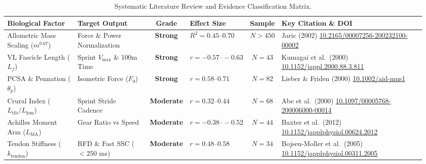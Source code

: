 \documentclass[11pt,a4paper]{article}
\begin{document}
\begin{table}[htbp]
\centering
\small
\caption{Systematic Literature Review and Evidence Classification Matrix.}
\label{tab:lit_matrix}
\begin{tabularx}{\textwidth}{p{3.2cm}p{2.8cm}cp{2.2cm}cp{3.4cm}}
\toprule
\textbf{Biological Factor} & \textbf{Target Output} & \textbf{Grade} & \textbf{Effect Size} & \textbf{Sample} & \textbf{Key Citation \& DOI} \\
\midrule
Allometric Mass Scaling ($m^{0.67}$) & Force \& Power Normalization & \textbf{Strong} & $R^2 = 0.45\text{--}0.70$ & $N > 450$ & Jaric (2002) \cite{jaric2002} \newline \href{https://doi.org/10.2165/00007256-200232100-00002}{10.2165/00007256-200232100-00002} \\
\addlinespace
VL Fascicle Length ($L_f$) & Sprint $V_{\text{max}}$ \& 100m Time & \textbf{Strong} & $r = -0.57\text{--}-0.63$ & $N = 43$ & Kumagai et al.\ (2000) \cite{kumagai2000} \newline \href{https://doi.org/10.1152/jappl.2000.88.3.811}{10.1152/jappl.2000.88.3.811} \\
\addlinespace
PCSA \& Pennation ($\theta_p$) & Isometric Force ($F_0$) & \textbf{Strong} & $r = 0.58\text{--}0.71$ & $N = 82$ & Lieber \& Friden (2000) \cite{lieber2000} \newline \href{https://doi.org/10.1002/1097-4598(200011)23:11<1647::aid-mus1>3.0.co;2-m}{10.1002/aid-mus1} \\
\addlinespace
Crural Index ($L_{\text{tib}}/L_{\text{fem}}$) & Sprint Stride Cadence & \textbf{Moderate} & $r = 0.32\text{--}0.44$ & $N = 68$ & Abe et al.\ (2000) \cite{abe2000} \newline \href{https://doi.org/10.1097/00005768-200006000-00014}{10.1097/00005768-200006000-00014} \\
\addlinespace
Achilles Moment Arm ($L_{\text{MA}}$) & Gear Ratio vs Speed & \textbf{Moderate} & $r = -0.38\text{--}-0.52$ & $N = 44$ & Baxter et al.\ (2012) \cite{baxter2012} \newline \href{https://doi.org/10.1152/japplphysiol.00624.2012}{10.1152/japplphysiol.00624.2012} \\
\addlinespace
Tendon Stiffness ($k_{\text{tendon}}$) & RFD \& Fast SSC ($<250$ ms) & \textbf{Moderate} & $r = 0.48\text{--}0.58$ & $N = 34$ & Bojsen-Moller et al.\ (2005) \cite{bojsen2005} \newline \href{https://doi.org/10.1152/japplphysiol.00311.2005}{10.1152/japplphysiol.00311.2005} \\

\end{tabularx}
\end{table}
\end{document}
